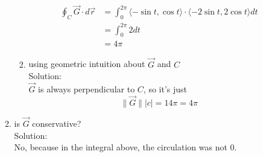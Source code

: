 \documentclass[11pt]{article}
\begin{document}
\begin{enumerate}
\begin{enumerate}
\begin{enumerate}
                        \begin{align*}
                          \oint_{C} \vec{G} \cdot d\vec{r} &= \int_{0}^{2\pi} \langle -\sin t, \cos t \rangle \cdot \langle -2 \sin t , 2\cos t \rangle dt\\
                                                           &= \int_{0}^{2\pi} 2 dt \\
                          &= 4\pi
                          \end{align*}
                  \item using geometric intuition about $\vec{G}$ and $C$ \\
                        Solution: \\
                        $\vec{G}$ is always perpendicular to $C$, so it's just
                        \[\|\vec{G}\| |c| = 1 4\pi = 4\pi\]
                \end{enumerate}
          \item is $\vec{G}$ conservative?
                \\Solution:\\
                No, because in the integral above, the circulation was not $0$.


\end{enumerate}
\end{enumerate}
\end{document}
